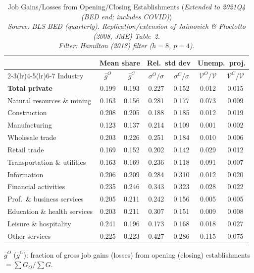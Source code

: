 \begin{table}[htbp]
\centering
\small
\caption{Job Gains/Losses from Opening/Closing Establishments (\emph{Extended to 2021Q4 (BED end; includes COVID)}) \\
  \emph{Source: BLS BED (quarterly). Replication/extension of Jaimovich \& Floetotto (2008, JME) Table~2.} \\  \emph{Filter: Hamilton (2018) filter ($h=8$, $p=4$).}}
\label{tab:jf_t2_ext_2021}
\begin{tabular}{lcccccc}
\toprule
 & \multicolumn{2}{c}{Mean share} & \multicolumn{2}{c}{Rel.\ std dev} & \multicolumn{2}{c}{Unemp.\ proj.} \\
\cmidrule(lr){2-3}\cmidrule(lr){4-5}\cmidrule(lr){6-7}
Industry & $\bar{g}^O$ & $\bar{g}^C$ & $\sigma^O/\sigma$ & $\sigma^C/\sigma$ & $\mathcal{V}^O/\mathcal{V}$ & $\mathcal{V}^C/\mathcal{V}$ \\
\midrule
\midrule
\textbf{Total private} & 0.199 & 0.193 & 0.227 & 0.152 & 0.012 & 0.015 \\
Natural resources \& mining & 0.163 & 0.156 & 0.281 & 0.177 & 0.073 & 0.009 \\
Construction & 0.208 & 0.205 & 0.188 & 0.185 & 0.012 & 0.019 \\
Manufacturing & 0.123 & 0.137 & 0.214 & 0.109 & 0.001 & 0.002 \\
Wholesale trade & 0.203 & 0.226 & 0.251 & 0.184 & 0.010 & 0.006 \\
Retail trade & 0.169 & 0.152 & 0.202 & 0.142 & 0.029 & 0.012 \\
Transportation \& utilities & 0.163 & 0.169 & 0.236 & 0.118 & 0.091 & 0.007 \\
Information & 0.206 & 0.209 & 0.284 & 0.310 & 0.012 & 0.020 \\
Financial activities & 0.235 & 0.246 & 0.343 & 0.323 & 0.028 & 0.022 \\
Prof.~\& business services & 0.205 & 0.211 & 0.242 & 0.156 & 0.005 & 0.005 \\
Education \& health services & 0.203 & 0.211 & 0.307 & 0.151 & 0.009 & 0.008 \\
Leisure \& hospitality & 0.241 & 0.196 & 0.173 & 0.168 & 0.018 & 0.027 \\
Other services & 0.225 & 0.223 & 0.427 & 0.286 & 0.115 & 0.075 \\
\bottomrule
\end{tabular}
\begin{tablenotes}[flushleft]\footnotesize
\item $\bar{g}^O$ ($\bar{g}^C$): fraction of gross job gains (losses) from opening (closing) establishments $= \sum G_O / \sum G$.

\end{tablenotes}
\end{table}
